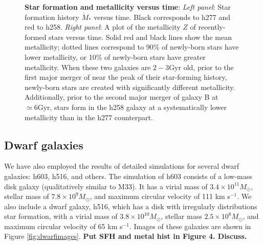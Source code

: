\documentclass[nofootinbib,twocolumn,prd]{emulateapj}
\newcommand\jillianremark[1]{{\color{blue}#1}}
\newcommand\msun{M_\odot}
\newcommand\unit[1]{\text{#1}}
\newcommand\ExcitingGalaxy{h258}
\newcommand\BoringGalaxy{h277}
\newcommand\DwarfOne{h603}
\newcommand\DwarfTwo{h516}
\begin{document}
\begin{figure}
\caption{\label{fig:TwoGalaxies}\textbf{Star formation and metallicity versus time}:  \emph{Left panel}: Star formation history $\dot{M}_{*}$
  versus time.  Black corresponds to \BoringGalaxy{} and red to \ExcitingGalaxy.  
\emph{Right panel}: A plot of the  metallicity $Z$ of recently-formed stars versus time.  Solid red and black lines show
the mean metallicity; dotted lines correspond to  90\% of newly-born stars have lower metallicity,   or 10\% of
newly-born stars have greater metallicity.  When these two galaxies are $2-3\unit{Gyr}$ old, prior to the first major
merger of  near the peak of their
star-forming history, newly-born stars are created with significantly different metallicity.  Additionally, prior to the
second major merger of galaxy B at $\simeq 6\unit{Gyr}$, stars form in the \ExcitingGalaxy{} galaxy at a systematically lower
metallicity than in the \BoringGalaxy{} counterpart.
}
\end{figure}


\subsection{Dwarf galaxies}

We have also employed the results of detailed simulations for several dwarf galaxies: \DwarfOne{}, \DwarfTwo{}, and others.  The simulation of h603 consists of a low-mass disk galaxy (qualitatively similar to M33).  It has a virial mass of $3.4 \times 10^{11} \msun$, stellar mass of $7.8 \times 10^9 \msun$, and maximum circular velocity of 111 km s$^{-1}$.  We also include a dwarf galaxy, h516, which has a disk with irregularly distributions star formation, with a virial mass of $3.8 \times 10^{10}\msun$, stellar mass $2.5 \times 10^8 \msun$, and maximum circular velocity of 65 km s$^{-1}$.  Images of these galaxies are shown in Figure \ref{fig:dwarfimages}. \jillianremark{ {\bf Put SFH and metal hist in Figure 4.  Discuss.}}

\end{document}
